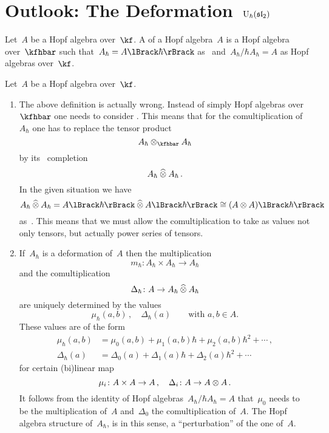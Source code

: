 \documentclass[a4paper, 11pt, oneside]{scrartcl}
\begin{document}
\section{Outlook: The Deformation~$\operatorname{U}_{\hbar}(\mathfrak{sl}_2)$}

\begin{definition}
  Let~$A$ be a Hopf algebra over~$\kf$.
  A  of a Hopf algebra~$A$ is a Hopf algebra over~$\kfhbar$ such that~$A_\hbar = \power{A}{\hbar}$ as~\modules{$\kfhbar$} and~$A_\hbar / \hbar A_\hbar = A$ as Hopf algebras over~$\kf$.
\end{definition}

\begin{remark}
  Let~$A$ be a Hopf algebra over~$\kf$.
  \begin{enumerate}
    \item
      The above definition is actually wrong.
      Instead of simply Hopf algebras over~$\kfhbar$ one needs to consider .
      This means that for the comultiplication of~$A_\hbar$ one has to replace the tensor product
      \[
        A_\hbar \tensor_{\kfhbar} A_\hbar
      \]
      by its~\adic{$\hbar$} completion
      \[
        A_\hbar \mathbin{\widehat{\otimes}} A_\hbar \,.
      \]
      In the given situation we have
      \[
        A_\hbar \ctensor A_\hbar
        =
        \power{A}{\hbar} \ctensor \power{A}{\hbar}
        \cong
        \power{(A \tensor A)}{\hbar}
      \]
      as~\modules{$\kfhbar$}.
      This means that we must allow the comultiplication to take as values not only tensors, but actually power series of tensors.
    \item
      If~$A_{\hbar}$ is a deformation of~$A$ then the multiplication
      \[
        m_{\hbar}
        \colon
        A_\hbar \times A_\hbar
        \to
        A_\hbar
      \]
      and the comultiplication
      \[
        \Delta_{\hbar}
        \colon
        A
        \to
        A_\hbar \mathbin{\widehat{\otimes}} A_\hbar
      \]
      are uniquely determined by the values
      \[
        \mu_{\hbar}(a,b) \,,
        \quad
        \Delta_{\hbar}(a)
        \qquad
        \text{with~$a, b \in A$.}
      \]
      These values are of the form
      \begin{align*}
        \mu_{\hbar}(a,b)
        &=
        \mu_0(a,b) + \mu_1(a,b) \hbar + \mu_2(a,b) \hbar^2 + \dotsb \,,
        \\
        \Delta_{\hbar}(a)
        &=
        \Delta_0(a) + \Delta_1(a) \hbar + \Delta_2(a) \hbar^2 + \dotsb
      \end{align*}
      for certain (bi)linear map
      \[
        \mu_i \colon A \times A \to A \,,
        \quad
        \Delta_i \colon A \to A \otimes A \,.
      \]
      It follows from the identity of Hopf algebras~$A_\hbar / \hbar A_\hbar = A$ that~$\mu_0$ needs to be the multiplication of~$A$ and~$\Delta_0$ the comultiplication of~$A$.
      The Hopf algebra structure of~$A_\hbar$, is in this sense, a \enquote{perturbation} of the one of~$A$.
  \end{enumerate}
\end{remark}
\end{document}
